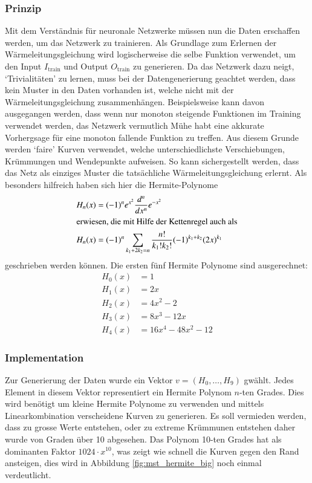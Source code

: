 \subsubsection{Prinzip}
Mit dem Verständnis für neuronale Netzwerke müssen nun die Daten erschaffen werden, um das Netzwerk zu trainieren. Als Grundlage zum Erlernen der Wärmeleitungsgleichung wird logischerweise die selbe Funktion verwendet, um den Input $I_{\text{train}}$ und Output $O_{\text{train}}$ zu generieren. Da das Netzwerk dazu neigt, `Trivialitäten' zu lernen, muss bei der Datengenerierung geachtet werden, dass kein Muster in den Daten vorhanden ist, welche nicht mit der Wärmeleitungsgleichung zusammenhängen. Beispielsweise kann davon ausgegangen werden, dass wenn nur monoton steigende Funktionen im Training verwendet werden, das Netzwerk vermutlich Mühe habt eine akkurate Vorhergsage für eine monoton fallende Funktion zu treffen. Aus diesem Grunde werden `faire' Kurven verwendet, welche unterschiedlichste Verschiebungen, Krümmungen und Wendepunkte aufweisen. So kann sichergestellt werden, dass das Netz als einziges Muster die tatsächliche Wärmeleitungsgleichung erlernt. Als besonders hilfreich haben sich hier die Hermite-Polynome
\begin{align}
	H_n(x) &=(-1)^{n}e^{x^{2}}{\frac {d^{n}}{d x^{n}}}e^{-x^{2}}
	\\
	\intertext{erwiesen, die mit Hilfe der Kettenregel auch als}
	H_n(x) &=(-1)^{n}\sum _{k_{1}+2k_{2}=n}{\frac {n!}{k_{1}!k_{2}!}}(-1)^{k_{1}+k_{2}}(2x)^{k_{1}}
\end{align}
geschrieben werden können.
Die ersten fünf Hermite Polynome sind ausgerechnet:
\begin{align}
H_{0}(x) &= 1\\
H_{1}(x) &= 2x\\
H_{2}(x) &= 4x^{2}-2\\
H_{3}(x) &= 8x^{3}-12x\\
H_{4}(x) &= 16x^{4}-48x^{2}-12
\end{align}

\subsubsection{Implementation}
Zur Generierung der Daten wurde ein Vektor $v=(H_0, \dots ,H_9)$ gwählt. Jedes Element in diesem Vektor representiert ein Hermite Polynom $n$-ten Grades. Dies wird benötigt um kleine Hermite Polynome zu verwenden und mittels Linearkombination verscheidene Kurven zu generieren. Es soll vermieden werden, dass zu grosse Werte entstehen, oder zu extreme Krümmunen entstehen daher wurde von Graden über 10 abgesehen. Das Polynom 10-ten Grades hat als dominanten Faktor $1024 \cdot x^{10}$, was zeigt wie schnell die Kurven gegen den Rand ansteigen, dies wird in Abbildung \ref{fig:mst_hermite_big} noch einmal verdeutlicht.

